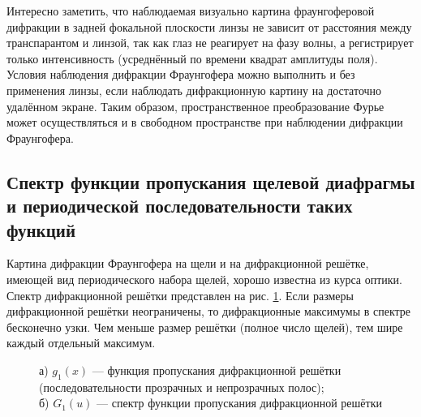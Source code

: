 \documentclass[a5paper,10pt, twoside]{article} %
\begin{document}
		Интересно заметить, что наблюдаемая визуально картина фраунгоферовой дифракции в задней фокальной плоскости линзы не зависит от расстояния между транспарантом и линзой, так как глаз не реагирует на фазу волны, а регистрирует только интенсивность (усреднённый по времени квадрат амплитуды поля). Условия наблюдения дифракции Фраунгофера можно выполнить и без применения линзы, если наблюдать дифракционную картину на достаточно удалённом экране. Таким образом, пространственное преобразование Фурье может осуществляться и в свободном пространстве при наблюдении дифракции Фраунгофера.
		
	\subsection{Спектр функции пропускания щелевой диафрагмы и периодической последовательности таких функций}
		
		Картина дифракции Фраунгофера на щели и на дифракционной решётке, имеющей вид периодического набора щелей, хорошо известна из курса оптики. Спектр дифракционной решётки представлен на рис. \ref{ris:dr}. Если размеры дифракционной решётки неограничены, то дифракционные максимумы в спектре бесконечно узки. Чем меньше размер решётки	(полное число щелей), тем шире каждый отдельный максимум.
		
		\begin{figure}[h]
			\begin{minipage}[h]{0.49\linewidth}
			\end{minipage}
			\hfill
			\begin{minipage}[h]{0.49\linewidth}
			\end{minipage}
			\caption
			{
				а) $g_1 (x)$ — функция пропускания дифракционной решётки (последовательности прозрачных и непрозрачных полос); \\
				б) $G_1 (u)$ — спектр функции пропускания дифракционной решётки
			}
			\label{ris:dr}
		\end{figure}
		
\end{document}
